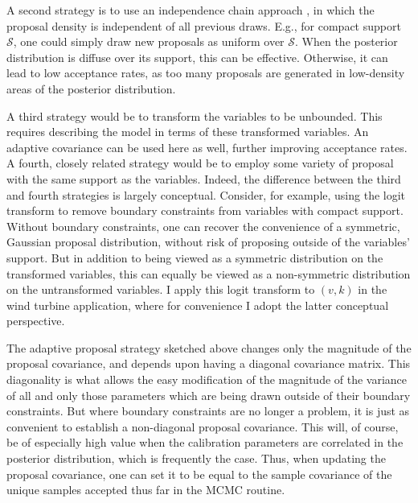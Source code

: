 \documentclass{article}
\begin{document}
A second strategy is to use an independence chain approach \citep{Tierney1994}, in which the proposal density is independent of all previous draws. E.g., for compact support $\mathcal S$, one could simply draw new proposals as uniform over $\mathcal S$. When the posterior distribution is diffuse over its support, this can be effective. Otherwise, it can lead to low acceptance rates, as too many proposals are generated in low-density areas of the posterior distribution. 

A third strategy would be to transform the variables to be unbounded. This requires describing the model in terms of these transformed variables. An adaptive covariance can be used here as well, further improving acceptance rates. A fourth, closely related strategy would be to employ some variety of proposal with the same support as the variables. Indeed, the difference between the third and fourth strategies is largely conceptual. Consider, for example, using the logit transform to remove boundary constraints from variables with compact support. Without boundary constraints, one can recover the convenience of a symmetric, Gaussian proposal distribution, without risk of proposing outside of the variables' support. But in addition to being viewed as a symmetric distribution on the transformed variables, this can equally be viewed as a non-symmetric distribution on the untransformed variables. I apply this logit transform to $(v,k)$ in the wind turbine application, where for convenience I adopt the latter conceptual perspective. 

The adaptive proposal strategy sketched above changes only the magnitude of the proposal covariance, and depends upon having a diagonal covariance matrix. This diagonality is what allows the easy modification of the magnitude of the variance of all and only those parameters which are being drawn outside of their boundary constraints. But where boundary constraints are no longer a problem, it is just as convenient to establish a non-diagonal proposal covariance. This will, of course, be of especially high value when the calibration parameters are correlated in the posterior distribution, which is frequently the case. Thus, when updating the proposal covariance, one can set it to be equal to the sample covariance of the unique samples accepted thus far in the MCMC routine.
\end{document}
